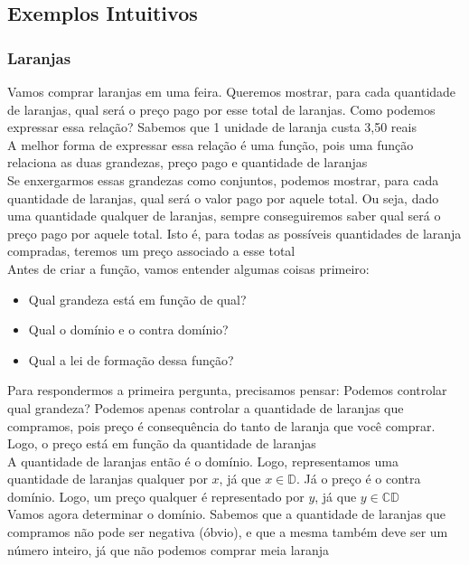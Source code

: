 \documentclass{article}
\begin{document}
\subsection{Exemplos Intuitivos}

\subsubsection{Laranjas}
Vamos comprar laranjas em uma feira. Queremos mostrar, para cada quantidade de laranjas, qual será o preço pago por esse total de laranjas. Como podemos expressar essa relação? Sabemos que 1 unidade de laranja custa 3,50 reais
\\[5pt]
A melhor forma de expressar essa relação é uma função, pois uma função relaciona as duas grandezas, preço pago e quantidade de laranjas
\\[5pt]
Se enxergarmos essas grandezas como conjuntos, podemos mostrar, para cada quantidade de laranjas, qual será o valor pago por aquele total. Ou seja, dado uma quantidade qualquer de laranjas, sempre conseguiremos saber qual será o preço pago por aquele total. Isto é, para todas as possíveis quantidades de laranja compradas, teremos um preço associado a esse total
\\[5pt]
Antes de criar a função, vamos entender algumas coisas primeiro:
\begin{itemize}
    \item Qual grandeza está em função de qual?

    \item Qual o domínio e o contra domínio?

    \item Qual a lei de formação dessa função?
\end{itemize}
Para respondermos a primeira pergunta, precisamos pensar: Podemos controlar qual grandeza? Podemos apenas controlar a quantidade de laranjas que compramos, pois preço é consequência do tanto de laranja que você comprar. Logo, o preço está em função da quantidade de laranjas
\\[2pt]
A quantidade de laranjas então é o domínio. Logo, representamos uma quantidade de laranjas qualquer por $x$, já que $x \in \mathbb{D}$. Já o preço é o contra domínio. Logo, um preço qualquer é representado por $y$, já que $y \in \mathbb{CD}$
\\[5pt]
Vamos agora determinar o domínio. Sabemos que a quantidade de laranjas que compramos não pode ser negativa (óbvio), e que a mesma também deve ser um número inteiro, já que não podemos comprar meia laranja
\end{document}

